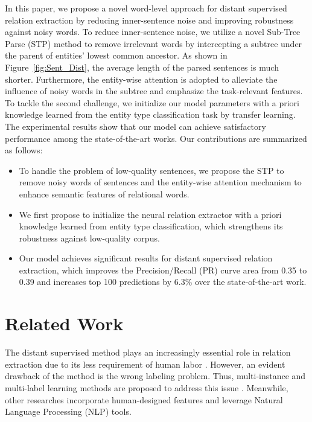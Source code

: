 \documentclass[11pt,a4paper]{article}
\begin{document}
  In this paper, we propose a novel word-level approach for distant supervised relation extraction by reducing inner-sentence noise and improving robustness against noisy words. To reduce inner-sentence noise, we utilize a novel Sub-Tree Parse (STP) method to remove irrelevant words by intercepting a subtree under the parent of entities' lowest common ancestor. As shown in Figure~\ref{fig:Sent_Dist}, the average length of the parsed sentences is much shorter. Furthermore, the entity-wise attention is adopted to alleviate the influence of noisy words in the subtree and emphasize the task-relevant features. To tackle the second challenge, we initialize our model parameters with a priori knowledge learned from the entity type classification task by transfer learning. The experimental results show that our model can achieve satisfactory performance among the state-of-the-art works. Our contributions are summarized as follows:

  \begin{itemize}
    \item To handle the problem of low-quality sentences, we propose the STP to remove noisy words of sentences and the entity-wise attention mechanism to enhance semantic features of relational words.

    \item We first propose to initialize the neural relation extractor with a priori knowledge learned from entity type classification, which strengthens its robustness against low-quality corpus.
    
    \item Our model achieves significant results for distant supervised relation extraction, which improves the Precision/Recall (PR) curve area from 0.35 to 0.39 and increases top 100 predictions by 6.3\% over the state-of-the-art work.
  \end{itemize}
  
  \section{Related Work}
  The distant supervised method plays an increasingly essential role in relation extraction due to its less requirement of human labor \citep{mintz2009distant}. However, an evident drawback of the method is the wrong labeling problem. Thus, multi-instance and multi-label learning methods are proposed to address this issue \citep{riedel2010modeling,hoffmann2011knowledge,surdeanu2012multi}. Meanwhile, other researches \citep{angeli2014combining,han2016global} incorporate human-designed features and leverage Natural Language Processing (NLP) tools.
   
\end{document}
